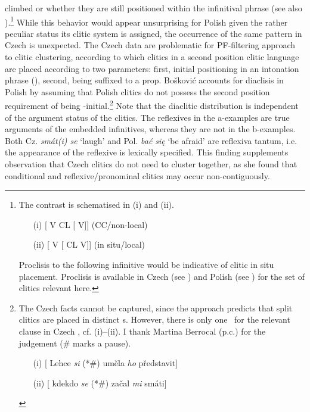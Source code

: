 \documentclass[output=paper,colorlinks,citecolor=brown]{langscibook}
\begin{document}
climbed or whether they are still positioned within the infinitival phrase (see also \citealt[67--68]{Junghanns2002a}).\footnote{The contrast is schematised in (i) and (ii).
\begin{enumerate}
    \item[(i)] [\textsubscript{\textalpha}  V\textsubscript{\textalpha} CL\textsubscript{\textbeta} [\textsubscript{\textbeta} V\textsubscript{\textbeta}]] (CC/non-local)
    \item[(ii)] [\textsubscript{\textalpha} V\textsubscript{\textalpha} [\textsubscript{\textbeta} CL\textsubscript{\textbeta} V\textsubscript{\textbeta}]] (in situ/local)
\end{enumerate}
         
\noindent Proclisis to the following infinitive would be indicative of clitic in situ placement. Proclisis is available in Czech (see \citealt{Toman1996}) and Polish (see \citealt[62--64]{Kraska-Szlenk1995}) for the set of clitics relevant here.} While this behavior would appear unsurprising for Polish given the rather peculiar status its clitic system is assigned, the occurrence of the same pattern in Czech is unexpected. The Czech data are problematic for  PF-filtering approach to clitic clustering, according to which clitics in a second position clitic language are placed according to two parameters: first, initial positioning in an intonation phrase (\textiota\textRho), second, being suffixed to a prop. Bošković accounts for diaclisis in Polish by assuming that Polish clitics do not possess the second position requirement of being \textiota\textRho-initial.\footnote{\label{kul:foot:TheChechData}The Czech facts cannot be captured, since the approach predicts that split clitics are placed in distinct \textiota\textRho s. However, there is only one \textiota\textRho\, for the relevant clause in Czech , cf. (i)–(ii). I thank Martina Berrocal (p.c.) for the judgement (\# marks a pause).
\begin{enumerate}
    \item[(i)]  [\textsubscript{\textiota\textRho} Lehce \textit{si} (*\#) uměla \textit{ho} představit]
    \item[(ii)] [\textsubscript{\textiota\textRho} kdekdo \textit{se} (*\#) začal \textit{mi} smáti]
\end{enumerate}
} 
Note that the diaclitic distribution is independent of the argument status of the clitics. The reflexives in the a-examples are true arguments of the embedded infinitives, whereas they are not in the b-examples. Both Cz. \textit{smát(i) se} ‘laugh’ and Pol. \textit{bać się} ‘be afraid’ are reflexiva tantum, i.e. the appearance of the reflexive is lexically specified. This finding supplements  observation that Czech cli\-tics do not need to cluster together, as she found that conditional and refle\-xive/pronominal clitics may occur non-contiguously.
\end{document}

